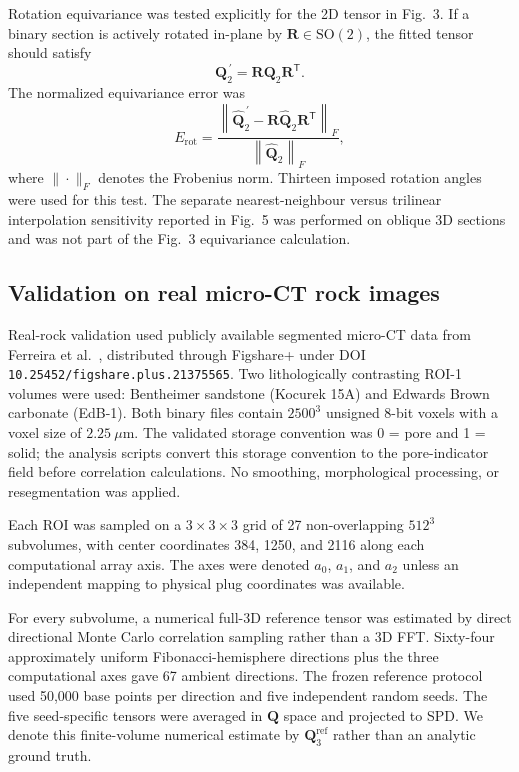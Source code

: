 \documentclass{article}
\begin{document}
Rotation equivariance was tested explicitly for the 2D tensor in Fig.~3. If a
binary section is actively rotated in-plane by
$\bm{R}\in\mathrm{SO}(2)$, the fitted tensor should satisfy
\begin{equation}
    \bm{Q}_{2}^{\,\prime}
    =
    \bm{R}
    \bm{Q}_{2}
    \bm{R}^{\mathsf T}.
    \label{eq:rotation_law}
\end{equation}
The normalized equivariance error was
\begin{equation}
    E_{\mathrm{rot}}
    =
    \frac{
        \left\|
        \widehat{\bm{Q}}_{2}^{\,\prime}
        -
        \bm{R}\widehat{\bm{Q}}_{2}\bm{R}^{\mathsf T}
        \right\|_{F}
    }{
        \left\|
        \widehat{\bm{Q}}_{2}
        \right\|_{F}
    },
    \label{eq:rotation_error}
\end{equation}
where $\|\cdot\|_{F}$ denotes the Frobenius norm. Thirteen imposed rotation
angles were used for this test. The separate nearest-neighbour versus
trilinear interpolation sensitivity reported in Fig.~5 was performed on
oblique 3D sections and was not part of the Fig.~3 equivariance calculation.

\subsection{Validation on real micro-CT rock images}
\label{subsec:real_rocks}

Real-rock validation used publicly available segmented micro-CT data from
Ferreira et al.~\citep{Ferreira2023}, distributed through Figshare+ under
DOI \texttt{10.25452/figshare.plus.21375565}. Two lithologically contrasting
ROI-1 volumes were used: Bentheimer sandstone (Kocurek 15A) and Edwards Brown
carbonate (EdB-1). Both binary files contain $2500^3$ unsigned 8-bit voxels
with a voxel size of $2.25~\mu$m. The validated storage convention was
0 = pore and 1 = solid; the analysis scripts convert this storage convention
to the pore-indicator field before correlation calculations. No smoothing,
morphological processing, or resegmentation was applied.

Each ROI was sampled on a $3\times3\times3$ grid of 27 non-overlapping
$512^3$ subvolumes, with center coordinates 384, 1250, and 2116 along each
computational array axis. The axes were denoted $a_0$, $a_1$, and $a_2$ unless
an independent mapping to physical plug coordinates was available.

For every subvolume, a numerical full-3D reference tensor was estimated by
direct directional Monte Carlo correlation sampling rather than a 3D FFT.
Sixty-four approximately uniform Fibonacci-hemisphere directions plus the
three computational axes gave 67 ambient directions. The frozen reference
protocol used 50,000 base points per direction and five independent random
seeds. The five seed-specific tensors were averaged in $\bm{Q}$ space and
projected to SPD. We denote this finite-volume numerical estimate by
$\bm{Q}_{3}^{\mathrm{ref}}$ rather than an analytic ground truth.
\end{document}
